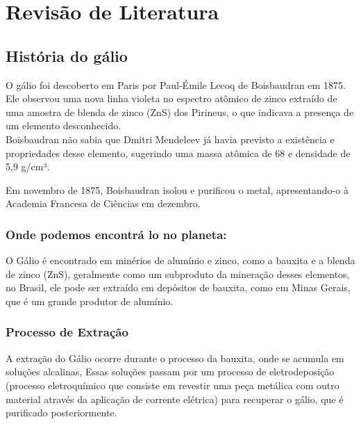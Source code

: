 \documentclass[12pt]{article}
\begin{document}
\section{Revisão de Literatura}
\subsection{História do gálio}
O gálio foi descoberto em Paris por Paul-Émile Lecoq de Boisbaudran em 1875. 
\\
Ele observou uma nova linha violeta no espectro atômico de zinco extraído de uma amostra de blenda de zinco (ZnS) dos Pirineus, o que indicava a presença de um elemento desconhecido.
\\
Boisbaudran não sabia que Dmitri Mendeleev já havia previsto a existência e propriedades desse elemento, sugerindo uma massa atômica de 68 e densidade de 5,9 g/cm³. 

Em novembro de 1875, Boisbaudran isolou e purificou o metal, apresentando-o à Academia Francesa de Ciências em dezembro.
\subsubsection{Onde podemos encontrá lo no planeta:}
O Gálio é encontrado em minérios de alumínio e zinco, como a bauxita e a blenda de zinco (ZnS), geralmente como um subproduto da mineração desses elementos, no Brasil, ele pode ser extraído em depósitos de bauxita, como em Minas Gerais, que é um grande produtor de alumínio.
\subsubsection{Processo de Extração}
A extração do Gálio ocorre durante o processo da bauxita, onde se acumula em soluções alcalinas, Essas soluções passam por um processo de eletrodeposição (processo eletroquímico que consiste em revestir uma peça metálica com outro material através da aplicação de corrente elétrica) para recuperar o gálio, que é purificado posteriormente. 
\end{document}
